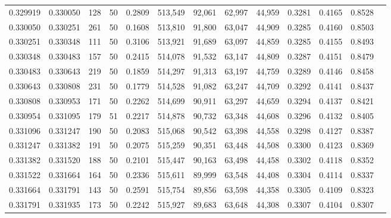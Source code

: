 \begin{tabular}{rrrrrrrrrrrrr}
0.329919 & 0.330050 &   128 &  50 &                                     0.2809 & 513,549 &  92,061 &  62,997 &  44,959 & 0.3281 & 0.4165 & 0.8528 \\
0.330050 & 0.330251 &   261 &  50 &                                     0.1608 & 513,810 &  91,800 &  63,047 &  44,909 & 0.3285 & 0.4160 & 0.8503 \\
0.330251 & 0.330348 &   111 &  50 &                                     0.3106 & 513,921 &  91,689 &  63,097 &  44,859 & 0.3285 & 0.4155 & 0.8493 \\
0.330348 & 0.330483 &   157 &  50 &                                     0.2415 & 514,078 &  91,532 &  63,147 &  44,809 & 0.3287 & 0.4151 & 0.8479 \\
0.330483 & 0.330643 &   219 &  50 &                                     0.1859 & 514,297 &  91,313 &  63,197 &  44,759 & 0.3289 & 0.4146 & 0.8458 \\
0.330643 & 0.330808 &   231 &  50 &                                     0.1779 & 514,528 &  91,082 &  63,247 &  44,709 & 0.3292 & 0.4141 & 0.8437 \\
0.330808 & 0.330953 &   171 &  50 &                                     0.2262 & 514,699 &  90,911 &  63,297 &  44,659 & 0.3294 & 0.4137 & 0.8421 \\
0.330954 & 0.331095 &   179 &  51 &                                     0.2217 & 514,878 &  90,732 &  63,348 &  44,608 & 0.3296 & 0.4132 & 0.8405 \\
0.331096 & 0.331247 &   190 &  50 &                                     0.2083 & 515,068 &  90,542 &  63,398 &  44,558 & 0.3298 & 0.4127 & 0.8387 \\
0.331247 & 0.331382 &   191 &  50 &                                     0.2075 & 515,259 &  90,351 &  63,448 &  44,508 & 0.3300 & 0.4123 & 0.8369 \\
0.331382 & 0.331520 &   188 &  50 &                                     0.2101 & 515,447 &  90,163 &  63,498 &  44,458 & 0.3302 & 0.4118 & 0.8352 \\
0.331522 & 0.331664 &   164 &  50 &                                     0.2336 & 515,611 &  89,999 &  63,548 &  44,408 & 0.3304 & 0.4114 & 0.8337 \\
0.331664 & 0.331791 &   143 &  50 &                                     0.2591 & 515,754 &  89,856 &  63,598 &  44,358 & 0.3305 & 0.4109 & 0.8323 \\
0.331791 & 0.331935 &   173 &  50 &                                     0.2242 & 515,927 &  89,683 &  63,648 &  44,308 & 0.3307 & 0.4104 & 0.8307 \\

\end{tabular}

